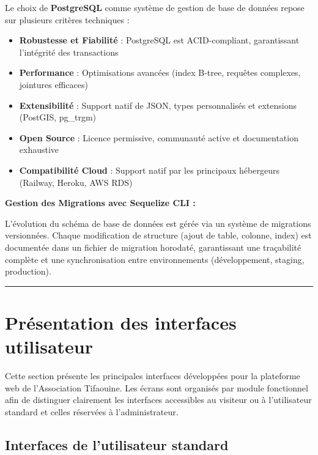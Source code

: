 \documentclass[12pt,a4paper,twoside,openright]{report}
\begin{document}
Le choix de \textbf{PostgreSQL} comme système de gestion de base de données repose sur plusieurs critères techniques :

\begin{itemize}[label=\textcolor{primaryBlue}{$\bullet$}, leftmargin=1.5cm, itemsep=0.3cm]
    \item \textbf{Robustesse et Fiabilité} : PostgreSQL est ACID-compliant, garantissant l'intégrité des transactions
    \item \textbf{Performance} : Optimisations avancées (index B-tree, requêtes complexes, jointures efficaces)
    \item \textbf{Extensibilité} : Support natif de JSON, types personnalisés et extensions (PostGIS, pg\_trgm)
    \item \textbf{Open Source} : Licence permissive, communauté active et documentation exhaustive
    \item \textbf{Compatibilité Cloud} : Support natif par les principaux hébergeurs (Railway, Heroku, AWS RDS)
\end{itemize}

\vspace{0.3cm}

\textbf{Gestion des Migrations avec Sequelize CLI :}

L'évolution du schéma de base de données est gérée via un système de migrations versionnées. Chaque modification de structure (ajout de table, colonne, index) est documentée dans un fichier de migration horodaté, garantissant une traçabilité complète et une synchronisation entre environnements (développement, staging, production).

\vspace{0.5cm}
\noindent\textcolor{primaryBlue!25}{\rule{\textwidth}{0.5pt}}
\vspace{0.4cm}

\section{Présentation des interfaces utilisateur}

Cette section présente les principales interfaces développées pour la plateforme web de l'Association Tifaouine. Les écrans sont organisés par module fonctionnel afin de distinguer clairement les interfaces accessibles au visiteur ou à l'utilisateur standard et celles réservées à l'administrateur.

\subsection{Interfaces de l'utilisateur standard}
\end{document}
